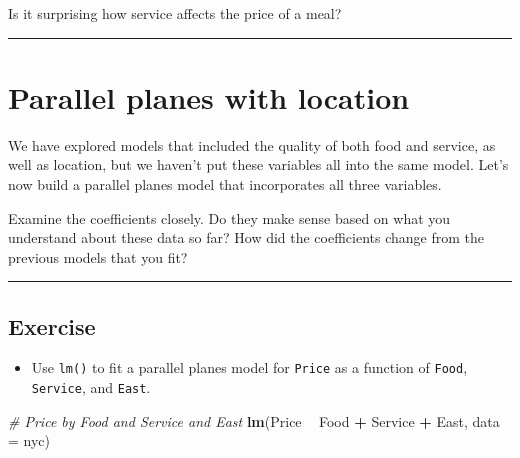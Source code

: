 \documentclass[]{book}
\newenvironment{Shaded}{\begin{snugshade}}{\end{snugshade}}
\newcommand{\KeywordTok}[1]{\textcolor[rgb]{0.13,0.29,0.53}{\textbf{#1}}}
\newcommand{\DataTypeTok}[1]{\textcolor[rgb]{0.13,0.29,0.53}{#1}}
\newcommand{\StringTok}[1]{\textcolor[rgb]{0.31,0.60,0.02}{#1}}
\newcommand{\CommentTok}[1]{\textcolor[rgb]{0.56,0.35,0.01}{\textit{#1}}}
\newcommand{\OtherTok}[1]{\textcolor[rgb]{0.56,0.35,0.01}{#1}}
\newcommand{\OperatorTok}[1]{\textcolor[rgb]{0.81,0.36,0.00}{\textbf{#1}}}
\newcommand{\NormalTok}[1]{#1}
\providecommand{\tightlist}{%
  \setlength{\itemsep}{0pt}\setlength{\parskip}{0pt}}
\begin{document}
\begin{Shaded}
\end{Shaded}

\hypertarget{htmlwidget-b38372eee96283519be5}{}

Is it surprising how service affects the price of a meal?

\begin{center}\rule{0.5\linewidth}{\linethickness}\end{center}

\section{Parallel planes with
location}\label{parallel-planes-with-location}

We have explored models that included the quality of both food and
service, as well as location, but we haven't put these variables all
into the same model. Let's now build a parallel planes model that
incorporates all three variables.

Examine the coefficients closely. Do they make sense based on what you
understand about these data so far? How did the coefficients change from
the previous models that you fit?

\begin{center}\rule{0.5\linewidth}{\linethickness}\end{center}

\subsection*{Exercise}\label{exercise-23}

\begin{itemize}
\tightlist
\item
  Use \texttt{lm()} to fit a parallel planes model for \texttt{Price} as
  a function of \texttt{Food}, \texttt{Service}, and \texttt{East}.
\end{itemize}

\begin{Shaded}
\begin{Highlighting}[]
\CommentTok{# Price by Food and Service and East}
\KeywordTok{lm}\NormalTok{(Price }\OperatorTok{~}\StringTok{ }\NormalTok{Food }\OperatorTok{+}\StringTok{ }\NormalTok{Service }\OperatorTok{+}\StringTok{ }\NormalTok{East, }\DataTypeTok{data =}\NormalTok{ nyc)}
\end{Highlighting}
\end{Shaded}
\end{document}
